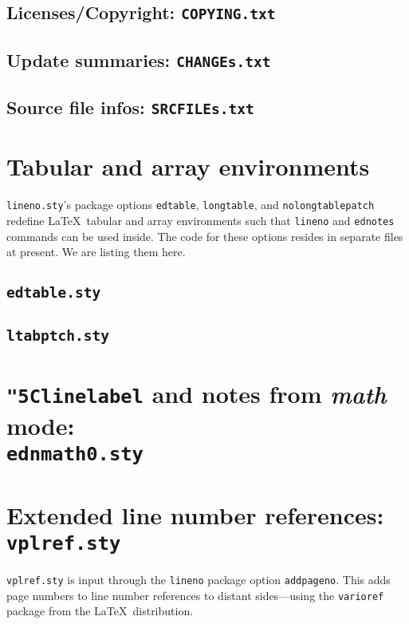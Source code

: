 \documentclass[10pt]{article}
\makeatletter
\newcommand*{\cs}[1]{\texttt{\char"5C#1}}
\newcommand*{\notinaux}[1]{%
  \ifx\protect\@typeset@protect #1%
  \else 
    \ifdim\lastskip>\z@\ignorespaces\fi 
  \fi}
\makeatother
\begin{document}
\subsection{Licenses/Copyright: \texttt{COPYING.txt}}

\subsection{Update summaries: \texttt{CHANGEs.txt}}

% 
\subsection{Source file infos: \texttt{SRCFILEs.txt}}


\section{Tabular and array environments}
\texttt{lineno.sty}'s package options \texttt{edtable}, 
\texttt{longtable}, and \texttt{nolongtablepatch} 
redefine \LaTeX\ tabular and array environments 
such that \texttt{lineno} and \texttt{ednotes} commands 
can be used inside. The code for these options resides 
in separate files at present. We are listing them here. 
\subsection{\texttt{edtable.sty}}

\subsection{\texttt{ltabptch.sty}}


\section{\cs{linelabel} and notes from \textit{math} mode: 
         \notinaux{\\} \texttt{ednmath0.sty}}


\section{Extended line number references: \texttt{vplref.sty}} 
\texttt{vplref.sty} is input through the \texttt{lineno} 
package option \texttt{addpageno}. This adds page numbers 
to line number references to distant sides---using the 
\texttt{varioref} package from the \LaTeX\ distribution. 
 
\end{document}

